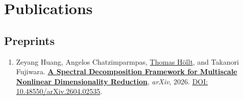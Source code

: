 \documentclass[10pt,a4paper,roman,final]{moderncv}
\newcommand*\highlightauthor[1]{\underline{#1}}
\begin{document}
\newpage


\section*{Publications}

\subsection*{Preprints}
\begin{enumerate}[leftmargin=0cm,start=1]
\item
Zeyang Huang, Angelos Chatzimparmpas, \highlightauthor{Thomas Höllt}, and Takanori Fujiwara.
\href{https://www.thomashollt.com/publications/2026_sdmp/}{\textbf{A Spectral Decomposition Framework for Multiscale Nonlinear Dimensionality Reduction}},
\emph{arXiv},
2026.
\href{https://doi.org/10.48550/arXiv.2604.02535}{DOI: 10.48550/\allowbreak arXiv.2604.02535}.


\end{enumerate}
\end{document}

